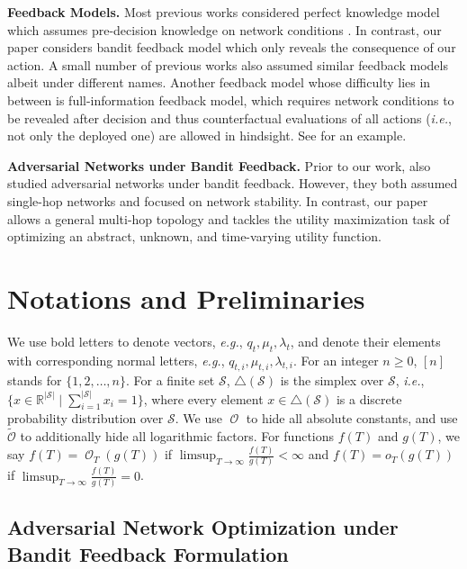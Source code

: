 \documentclass[11pt,fullpage,letterpaper]{article} %
\renewcommand{\bm}[1]{#1}%
\renewcommand{\tilde}{\widetilde}
\renewcommand{\O}{\operatorname{\mathcal O}}
\newcommand{\Otil}{\operatorname{\tilde{\mathcal O}}}
\begin{document}
\textbf{Feedback Models.}
Most previous works considered perfect knowledge model which assumes pre-decision knowledge on network conditions \citep{liang2018minimizing,liang2018network}.
In contrast, our paper considers bandit feedback model which only reveals the consequence of our action. A small number of previous works \citep{fu2022joint,yang2023learning,huang2023queue} also assumed similar feedback models albeit under different names.
Another feedback model whose difficulty lies in between is full-information feedback model, which requires network conditions to be revealed after decision and thus counterfactual evaluations of all actions (\textit{i.e.}, not only the deployed one) are allowed in hindsight. See \citep{neely2012max} for an example.

\textbf{Adversarial Networks under Bandit Feedback.}
Prior to our work, \citet{huang2023queue,yang2023learning} also studied adversarial networks under bandit feedback. However, they both assumed single-hop networks and focused on network stability. In contrast, our paper allows a general multi-hop topology and tackles the utility maximization task of optimizing an abstract, unknown, and time-varying utility function.

\section{Notations and Preliminaries}\label{sec:preliminaries}
We use bold letters to denote vectors, \textit{e.g.}, $\bm q_t,\bm \mu_t,\bm \lambda_t$, and denote their elements with corresponding normal letters, \textit{e.g.}, $q_{t,i},\mu_{t,i},\lambda_{t,i}$.
For an integer $n\ge 0$, $[n]$ stands for $\{1,2,\ldots,n\}$. For a finite set $\mathcal S$, $\triangle(\mathcal S)$ is the simplex over $\mathcal S$, \textit{i.e.}, $\{\bm x\in \mathbb R^{\lvert \mathcal S\rvert}\mid \sum_{i=1}^{\lvert \mathcal S\rvert} x_i=1\}$, where every element $\bm x\in \triangle(\mathcal S)$ is a discrete probability distribution over $\mathcal S$.
We use $\O$ to hide all absolute constants, and use $\Otil$ to additionally hide all logarithmic factors.
For functions $f(T)$ and $g(T)$, we say $f(T)=\O_T(g(T))$ if $\limsup_{T\to \infty} \frac{f(T)}{g(T)}<\infty$ and $f(T)=o_T(g(T))$ if $\limsup_{T\to \infty} \frac{f(T)}{g(T)}=0$.

\subsection{Adversarial Network Optimization under Bandit Feedback Formulation}
\end{document}
